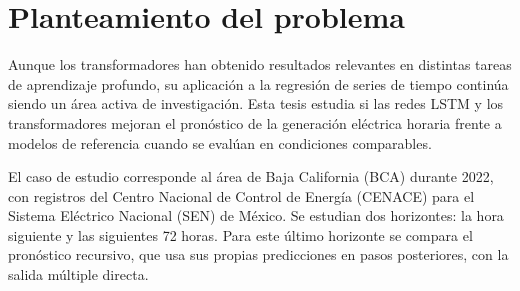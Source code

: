 \section{Planteamiento del problema}

Aunque los transformadores han obtenido resultados relevantes en distintas tareas de aprendizaje profundo, su aplicación a la regresión de series de tiempo continúa siendo un área activa de investigación. Esta tesis estudia si las redes LSTM y los transformadores mejoran el pronóstico de la generación eléctrica horaria frente a modelos de referencia cuando se evalúan en condiciones comparables.

El caso de estudio corresponde al área de Baja California (BCA) durante 2022, con registros del Centro Nacional de Control de Energía (CENACE) para el Sistema Eléctrico Nacional (SEN) de México. Se estudian dos horizontes: la hora siguiente y las siguientes 72 horas. Para este último horizonte se compara el pronóstico recursivo, que usa sus propias predicciones en pasos posteriores, con la salida múltiple directa.
